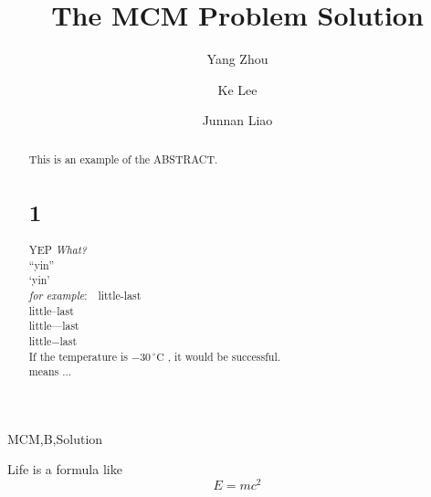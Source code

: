 \documentclass{mcmthesis}%
\title{The MCM Problem Solution}
\author{Yang Zhou\and Ke Lee\and Junnan Liao}%
\date{\large\the\year}
\begin{document}
  \begin{abstract}%
    This is an example of the ABSTRACT. \\
    \section{1}
    YEP
    \emph{What?}%
    \\
    ``yin''\\%
    `yin'\\
    \emph{for example}:\ \ little-last\\little--last\\little---last\\little$-$last\\
    If the temperature is $-30\,^{\circ}\mathrm{C}$ , it would be successful.\\%
    \idots means ...\\

  \end{abstract}

  \begin{keywords}
    MCM,B,Solution
  \end{keywords}
\maketitle%

Life is a formula like
$$E=mc^2$$
\end{document}
